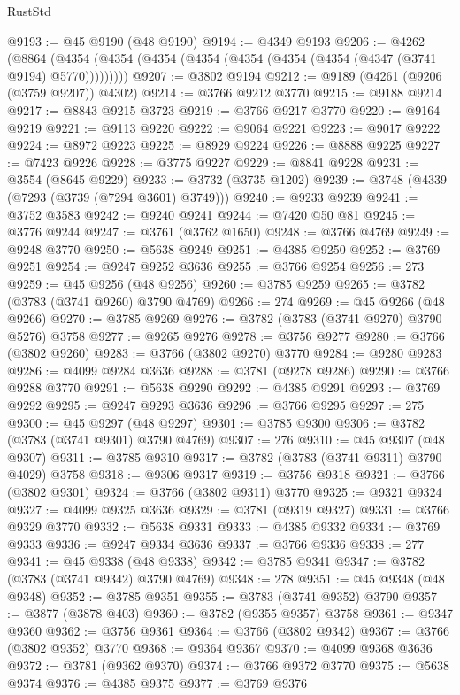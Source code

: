 \begin{lexlean}{RustStd}
\begin{coremodule}
@9193 := @45 @9190 (@48 @9190)
@9194 := @4349 @9193
@9206 := @4262
    (@8864 (@4354 (@4354 (@4354 (@4354 (@4354 (@4354 (@4354 (@4347 (@3741 @9194) @5770)))))))))
@9207 := @3802 @9194
@9212 := @9189 (@4261 (@9206 (@3759 @9207)) @4302)
@9214 := @3766 @9212 @3770
@9215 := @9188 @9214
@9217 := @8843 @9215 @3723
@9219 := @3766 @9217 @3770
@9220 := @9164 @9219
@9221 := @9113 @9220
@9222 := @9064 @9221
@9223 := @9017 @9222
@9224 := @8972 @9223
@9225 := @8929 @9224
@9226 := @8888 @9225
@9227 := @7423 @9226
@9228 := @3775 @9227
@9229 := @8841 @9228
@9231 := @3554 (@8645 @9229)
@9233 := @3732 (@3735 @1202)
@9239 := @3748 (@4339 (@7293 (@3739 (@7294 @3601) @3749)))
@9240 := @9233 @9239
@9241 := @3752 @3583
@9242 := @9240 @9241
@9244 := @7420 @50 @81
@9245 := @3776 @9244
@9247 := @3761 (@3762 @1650)
@9248 := @3766 @4769
@9249 := @9248 @3770
@9250 := @5638 @9249
@9251 := @4385 @9250
@9252 := @3769 @9251
@9254 := @9247 @9252 @3636
@9255 := @3766 @9254
@9256 := 273
@9259 := @45 @9256 (@48 @9256)
@9260 := @3785 @9259
@9265 := @3782 (@3783 (@3741 @9260) @3790 @4769)
@9266 := 274
@9269 := @45 @9266 (@48 @9266)
@9270 := @3785 @9269
@9276 := @3782 (@3783 (@3741 @9270) @3790 @5276) @3758
@9277 := @9265 @9276
@9278 := @3756 @9277
@9280 := @3766 (@3802 @9260)
@9283 := @3766 (@3802 @9270) @3770
@9284 := @9280 @9283
@9286 := @4099 @9284 @3636
@9288 := @3781 (@9278 @9286)
@9290 := @3766 @9288 @3770
@9291 := @5638 @9290
@9292 := @4385 @9291
@9293 := @3769 @9292
@9295 := @9247 @9293 @3636
@9296 := @3766 @9295
@9297 := 275
@9300 := @45 @9297 (@48 @9297)
@9301 := @3785 @9300
@9306 := @3782 (@3783 (@3741 @9301) @3790 @4769)
@9307 := 276
@9310 := @45 @9307 (@48 @9307)
@9311 := @3785 @9310
@9317 := @3782 (@3783 (@3741 @9311) @3790 @4029) @3758
@9318 := @9306 @9317
@9319 := @3756 @9318
@9321 := @3766 (@3802 @9301)
@9324 := @3766 (@3802 @9311) @3770
@9325 := @9321 @9324
@9327 := @4099 @9325 @3636
@9329 := @3781 (@9319 @9327)
@9331 := @3766 @9329 @3770
@9332 := @5638 @9331
@9333 := @4385 @9332
@9334 := @3769 @9333
@9336 := @9247 @9334 @3636
@9337 := @3766 @9336
@9338 := 277
@9341 := @45 @9338 (@48 @9338)
@9342 := @3785 @9341
@9347 := @3782 (@3783 (@3741 @9342) @3790 @4769)
@9348 := 278
@9351 := @45 @9348 (@48 @9348)
@9352 := @3785 @9351
@9355 := @3783 (@3741 @9352) @3790
@9357 := @3877 (@3878 @403)
@9360 := @3782 (@9355 @9357) @3758
@9361 := @9347 @9360
@9362 := @3756 @9361
@9364 := @3766 (@3802 @9342)
@9367 := @3766 (@3802 @9352) @3770
@9368 := @9364 @9367
@9370 := @4099 @9368 @3636
@9372 := @3781 (@9362 @9370)
@9374 := @3766 @9372 @3770
@9375 := @5638 @9374
@9376 := @4385 @9375
@9377 := @3769 @9376

\end{coremodule}
\end{lexlean}

